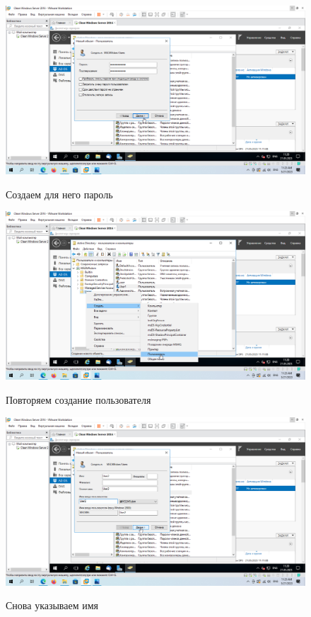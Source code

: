 \documentclass[a4paper]{article}
\begin{document}
  \begin{figure}[H]
    \centering
    \includegraphics[width=\textwidth]{11_0099}
    \label{img:99}
    \caption{Создаем для него пароль}
  \end{figure}

  \begin{figure}[H]
    \centering
    \includegraphics[width=\textwidth]{11_0100}
    \label{img:100}
    \caption{Повторяем создание пользователя}
  \end{figure}

  \begin{figure}[H]
    \centering
    \includegraphics[width=\textwidth]{11_0101}
    \label{img:101}
    \caption{Снова указываем имя}
  \end{figure}
\end{document}
